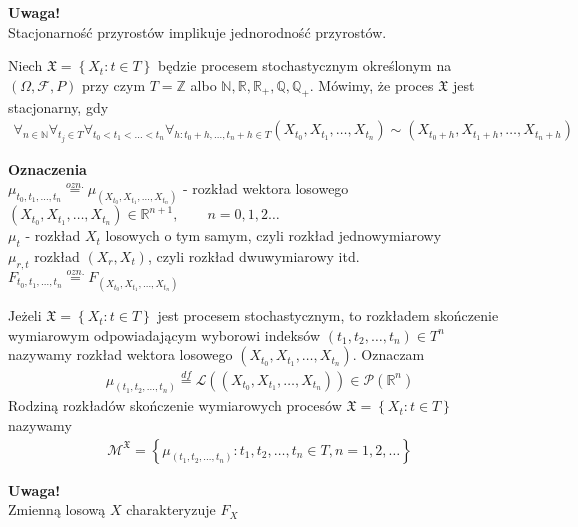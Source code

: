 \textbf{Uwaga!}\\
Stacjonarność przyrostów implikuje jednorodność przyrostów.
\begin{defi}
Niech $ \mathfrak X=\left\{X_t:t\in T\right\} $ będzie procesem stochastycznym określonym na $(\Omega,\mathcal F,P)$ przy czym $ T=\mathbb Z $ albo $ \mathbb N ,\mathbb R ,\mathbb R _+,\mathbb Q,\mathbb Q_+ $. Mówimy, że proces $ \mathfrak X $ jest stacjonarny, gdy
\begin{gather*}
\forall_{n\in \mathbb N }\forall_{t_j\in T}\forall_{t_0<t_1<\dots<t_n}\forall_{h:t_0+h,\dots,t_n+h\in T}
\left(X_{t_0},X_{t_1},\dots,X_{t_n}\right)
\sim
\left(X_{t_0+h},X_{t_1+h},\dots,X_{t_n+h}\right)
\end{gather*}
\end{defi}
\textbf{Oznaczenia}\\
$ \mu_{t_0,t_1,\dots,t_n}\stackrel{ozn.}{=}\mu_{\left(X_{t_0},X_{t_1},\dots,X_{t_n}\right)} $ - rozkład wektora losowego \\
$ \left(X_{t_0},X_{t_1},\dots,X_{t_n}\right)\in \mathbb R ^{n+1},\qquad n=0,1,2\dots $\\
$ \mu_t $ - rozkład $ X_t $ losowych o tym samym, czyli rozkład jednowymiarowy\\
$ \mu_{r,t} $ rozkład $ \left(X_r,X_t\right) $, czyli rozkład dwuwymiarowy itd.\\
$ F_{t_0,t_1,\dots,t_n} \stackrel{ozn.}{=}F_{\left(X_{t_0},X_{t_1},\dots,X_{t_n}\right)}$
\begin{defi}
Jeżeli $ \mathfrak X=\left\{X_t:t\in T\right\} $ jest procesem stochastycznym, to rozkładem skończenie wymiarowym odpowiadającym wyborowi indeksów $ \left(t_1,t_2,\dots,t_n\right)\in T^n $ nazywamy rozkład wektora losowego $ \left(X_{t_0},X_{t_1},\dots,X_{t_n}\right) $. Oznaczam
\begin{gather*}
\mu_{\left(t_1,t_2,\dots,t_n\right)}\stackrel{df}{=}\mathcal L\left(\left(X_{t_0},X_{t_1},\dots,X_{t_n}\right)\right)\in\mathcal P\left(\mathbb R ^n\right)
\end{gather*}
Rodziną rozkładów skończenie wymiarowych procesów $ \mathfrak X=\left\{X_t:t\in T\right\} $ nazywamy
\begin{gather*}
\mathcal M^\mathfrak X=
\left\{
\mu_{\left(t_1,t_2,\dots,t_n\right)}:t_1,t_2,\dots,t_n\in T,n=1,2,\dots
\right\}
\end{gather*}
\end{defi}
\textbf{Uwaga!}\\
Zmienną losową $ X $ charakteryzuje $ F_X $\\
